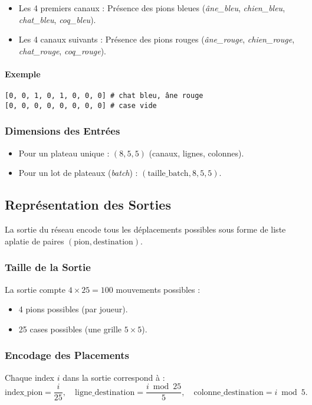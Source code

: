 \documentclass[]{article}
\begin{document}
\begin{itemize}
    \item Les 4 premiers canaux : Présence des pions bleues (\textit{âne\_bleu}, \textit{chien\_bleu}, \textit{chat\_bleu}, \textit{coq\_bleu}).
    \item Les 4 canaux suivants : Présence des pions rouges (\textit{âne\_rouge}, \textit{chien\_rouge}, \textit{chat\_rouge}, \textit{coq\_rouge}).
\end{itemize}

\paragraph{Exemple}

\begin{verbatim}
[0, 0, 1, 0, 1, 0, 0, 0] # chat bleu, âne rouge
[0, 0, 0, 0, 0, 0, 0, 0] # case vide
\end{verbatim}

\subsubsection{Dimensions des Entrées}
\begin{itemize}
    \item Pour un plateau unique : \((8, 5, 5)\) (canaux, lignes, colonnes).
    \item Pour un lot de plateaux (\textit{batch}) : \((\text{taille\_batch}, 8, 5, 5)\).
\end{itemize}

\subsection{Représentation des Sorties}
La sortie du réseau encode tous les déplacements possibles sous forme de liste aplatie de paires \((\text{pion}, \text{destination})\).

\subsubsection{Taille de la Sortie}
La sortie compte \(4 \times 25 = 100\) mouvements possibles :
\begin{itemize}
    \item 4 pions possibles (par joueur).
    \item 25 cases possibles (une grille \(5 \times 5\)).
\end{itemize}

\subsubsection{Encodage des Placements}
Chaque index \(i\) dans la sortie correspond à :
\[
\text{index\_pion} = \frac{i}{25}, \quad
\text{ligne\_destination} = \frac{i \bmod 25}{5}, \quad
\text{colonne\_destination} = i \bmod 5.
\]
\end{document}
